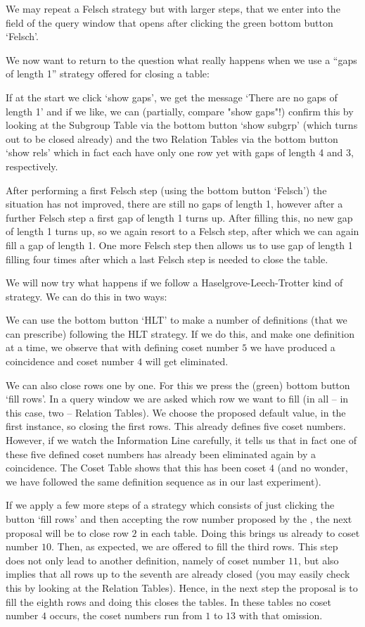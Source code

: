We may repeat a Felsch strategy but with larger steps, that we enter
into the field of the query window that opens after clicking the green
bottom button `Felsch'.

We now want to return to the question what really happens when we use
a ``gaps of length 1'' strategy offered for closing a table:

If at the start we click `show gaps', we get the message `There are no
gaps of length 1' and if we like, we can (partially, compare "show
gaps"!) confirm this by looking at the Subgroup Table via the bottom
button `show subgrp' (which turns out to be closed already) and the
two Relation Tables via the bottom button `show rels' which in fact
each have only one row yet with gaps of length 4 and 3,
respectively.

After performing a first Felsch step (using the bottom button
`Felsch') the situation has not improved, there are still no gaps of
length 1, however after a further Felsch step a first gap of length
1 turns up. After filling this, no new gap of length 1 turns up,
so we again resort to a Felsch step, after which we can again fill a
gap of length 1. One more Felsch step then allows us to use gap
of length 1 filling four times after which a last Felsch step is
needed to close the table.

We will now try what happens if we follow a Haselgrove-Leech-Trotter
kind of strategy. We can do this in two ways:

We can use the bottom button `HLT' to make a number of definitions
(that we can prescribe) following the HLT strategy. If we do this,
and make one definition at a time, we observe that with defining coset
number $5$ we have produced a coincidence and coset number $4$ will
get eliminated.

We can also close rows one by one. For this we press the (green)
bottom button `fill rows'. In a query window we are asked which row we
want to fill (in all -- in this case, two -- Relation Tables). We choose
the proposed default value, in the first instance, so closing the first
rows. This already defines five coset numbers. However, if we watch
the Information Line carefully, it tells us that in fact one of these
five defined coset numbers has already been eliminated again by a
coincidence. The Coset Table shows that this has been coset $4$ (and
no wonder, we have followed the same definition sequence as in our last
experiment).

If we apply a few more steps of a strategy which consists of just
clicking the button `fill rows' and then accepting the row number
proposed by the {\ITC}, the next proposal will be to close row $2$ in
each table. Doing this brings us already to coset number $10$. Then,
as expected, we are offered to fill the third rows. This step does not
only lead to another definition, namely of coset number $11$, but also
implies that all rows up to the seventh are already closed (you may
easily check this by looking at the Relation Tables). Hence, in the
next step the proposal is to fill the eighth rows and doing this
closes the tables. In these tables no coset number $4$ occurs, the
coset numbers run from $1$ to $13$ with that omission.

